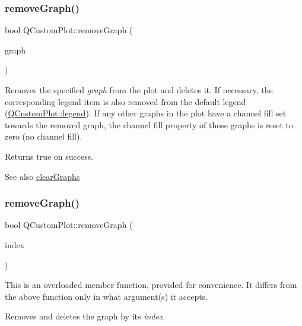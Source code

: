 \subsubsection{\texorpdfstring{remove\+Graph()}{removeGraph()}\hspace{0.1cm}{\footnotesize\ttfamily [1/2]}}
{\footnotesize\ttfamily bool Q\+Custom\+Plot\+::remove\+Graph (\begin{DoxyParamCaption}\item[{\hyperlink{classQCPGraph}{Q\+C\+P\+Graph} $\ast$}]{graph }\end{DoxyParamCaption})}

Removes the specified {\itshape graph} from the plot and deletes it. If necessary, the corresponding legend item is also removed from the default legend (\hyperlink{classQCustomPlot_a4eadcd237dc6a09938b68b16877fa6af}{Q\+Custom\+Plot\+::legend}). If any other graphs in the plot have a channel fill set towards the removed graph, the channel fill property of those graphs is reset to zero (no channel fill).

Returns true on success.

\begin{DoxySeeAlso}{See also}
\hyperlink{classQCustomPlot_ab0f3abff2d2f7df3668b5836f39207fa}{clear\+Graphs} 
\end{DoxySeeAlso}
\mbox{\label{classQCustomPlot_a9554b3d2d5b10c0f884bd4010b6c192c}} 
\subsubsection{\texorpdfstring{remove\+Graph()}{removeGraph()}\hspace{0.1cm}{\footnotesize\ttfamily [2/2]}}
{\footnotesize\ttfamily bool Q\+Custom\+Plot\+::remove\+Graph (\begin{DoxyParamCaption}\item[{int}]{index }\end{DoxyParamCaption})}

This is an overloaded member function, provided for convenience. It differs from the above function only in what argument(s) it accepts.

Removes and deletes the graph by its {\itshape index}. \mbox{\label{classQCustomPlot_ae04446557292551e8fb6e2c106e1848d}} 

